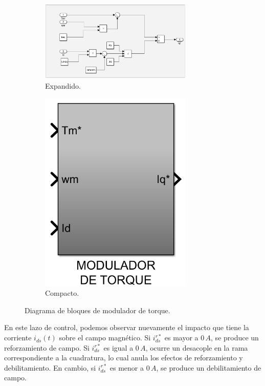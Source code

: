 \documentclass{article}
\begin{document}
\begin{figure}[H]
    \begin{subfigure}[b]{0.75\textwidth}
        \centering
        \includegraphics[width=0.8\textwidth]{modulador_de_torque_expandido.png}
        \caption{Expandido.}
    \end{subfigure}
    \begin{subfigure}[b]{0.24\textwidth}
        \centering
        \includegraphics[width=0.8\textwidth]{modulador_de_torque.png}
        \caption{Compacto.}
    \end{subfigure}
    \caption{Diagrama de bloques de modulador de torque.}
\end{figure}

En este lazo de control, podemos observar nuevamente el impacto que tiene la corriente $i_{ds}(t)$ 
sobre el campo magnético. Si $i_{ds}^{r*}$ es mayor a $0\,A$, se produce un reforzamiento de campo. Si 
$i_{ds}^{r*}$ es igual a $0\,A$, ocurre un desacople en la rama correspondiente a la cuadratura, lo cual 
anula los efectos de reforzamiento y debilitamiento. En cambio, si $i_{ds}^{r*}$ es menor a $0\,A$, se 
produce un debilitamiento de campo.
\end{document}
